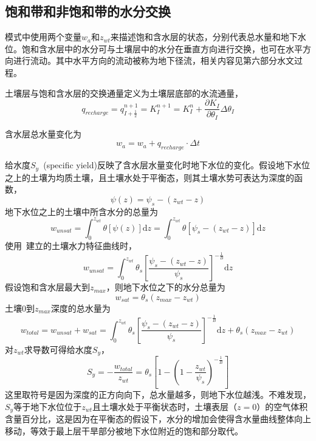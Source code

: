 \subsection{饱和带和非饱和带的水分交换} \label{sec:exchange_sat_unsat}
模式中使用两个变量$w_a$和$z_{wt}$来描述饱和含水层的状态，分别代表总水量和地下水位。饱和含水层中的水分可与土壤层中的水分在垂直方向进行交换，也可在水平方向进行流动。其中水平方向的流动被称为地下径流，相关内容见第六部分水文过程。

土壤层与饱和含水层的交换通量定义为土壤层底部的水流通量，
\begin{equation}
{q}_{recharge}=q_{I+\frac{1}{2}}^{n+1}=K_{I}^{n+1} = K_I^n + \frac{\partial K_{I}}{\partial \theta_{I}} \Delta \theta_{I}
\end{equation}

含水层总水量变化为
\begin{equation}
w_{a}=w_{a}+q_{recharge} \cdot \Delta t
\end{equation}

给水度$S_y$~(specific yield)反映了含水层水量变化时地下水位的变化。假设地下水位之上的土壤为均质土壤，且土壤水处于平衡态，则其土壤水势可表达为深度的函数，
\begin{equation}
    \psi \left(z\right) = \psi_s - \left(z_{wt} - z\right)
\end{equation}
地下水位之上的土壤中所含水分的总量为
\begin{equation}
    w_{unsat} = \int^{z_{wt}}_0 \theta\left[\psi\left(z\right)\right] \mathrm{d}z = \int^{z_{wt}}_0 \theta\left[\psi_s - \left(z_{wt} - z\right)\right] \mathrm{d}z
\end{equation}
使用~\citet{campbell1974}建立的土壤水力特征曲线时，
\begin{equation}
    w_{unsat} = \int^{z_{wt}}_0 \theta_s\left[\frac{\psi_s - \left(z_{wt} - z\right)}{\psi_s}\right]^{-\frac{1}{B}} \mathrm{d}z
\end{equation}
假设饱和含水层最大到$z_{max}$，则地下水位之下的水分总量为
\begin{equation}
w_{sat} = \theta_s\left(z_{max}-z_{wt}\right)
\end{equation}
土壤$0$到$z_{max}$深度的总水量为
\begin{equation}
    w_{total} = w_{unsat} + w_{sat} = \int^{z_{wt}}_0 \theta_s\left[\frac{\psi_s - \left(z_{wt} - z\right)}{\psi_s}\right]^{-\frac{1}{B}} \mathrm{d}z + \theta_s\left(z_{max}-z_{wt}\right)
\end{equation}
对$z_{wt}$求导数可得给水度$S_y$，
\begin{equation}
{S}_{{y}} = -\frac{w_{total}}{z_{wt}} = \theta_{s}\left[1-\left(1-\frac{z_{w t}}{\psi_{s}}\right)^{-\frac{1}{B}}\right] \label{eqn:s_y}
\end{equation}
这里取符号是因为深度的正方向向下，总水量越多，则地下水位越浅。不难发现，$S_y$等于地下水位位于$z_{wt}$且土壤水处于平衡状态时，土壤表层（$z=0$）的空气体积含量百分比，这是因为在平衡态的假设下，水分的增加会使得含水量曲线整体向上移动，等效于最上层干旱部分被地下水位附近的饱和部分取代。

